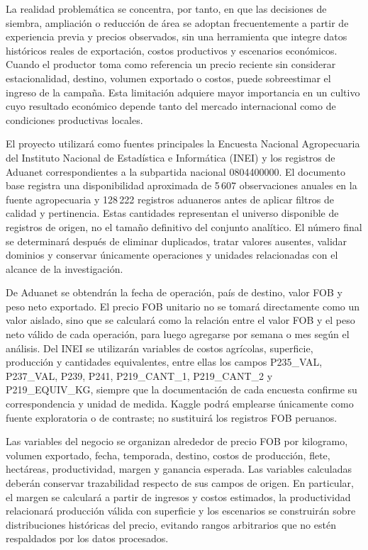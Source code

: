 La realidad problemática se concentra, por tanto, en que las decisiones de siembra, ampliación o reducción de área se adoptan frecuentemente a partir de experiencia previa y precios observados, sin una herramienta que integre datos históricos reales de exportación, costos productivos y escenarios económicos. Cuando el productor toma como referencia un precio reciente sin considerar estacionalidad, destino, volumen exportado o costos, puede sobreestimar el ingreso de la campaña. Esta limitación adquiere mayor importancia en un cultivo cuyo resultado económico depende tanto del mercado internacional como de condiciones productivas locales.

El proyecto utilizará como fuentes principales la Encuesta Nacional Agropecuaria del Instituto Nacional de Estadística e Informática (INEI) y los registros de Aduanet correspondientes a la subpartida nacional 0804400000. El documento base registra una disponibilidad aproximada de 5\,607 observaciones anuales en la fuente agropecuaria y 128\,222 registros aduaneros antes de aplicar filtros de calidad y pertinencia. Estas cantidades representan el universo disponible de registros de origen, no el tamaño definitivo del conjunto analítico. El número final se determinará después de eliminar duplicados, tratar valores ausentes, validar dominios y conservar únicamente operaciones y unidades relacionadas con el alcance de la investigación.

De Aduanet se obtendrán la fecha de operación, país de destino, valor FOB y peso neto exportado. El precio FOB unitario no se tomará directamente como un valor aislado, sino que se calculará como la relación entre el valor FOB y el peso neto válido de cada operación, para luego agregarse por semana o mes según el análisis. Del INEI se utilizarán variables de costos agrícolas, superficie, producción y cantidades equivalentes, entre ellas los campos P235\_VAL, P237\_VAL, P239, P241, P219\_CANT\_1, P219\_CANT\_2 y P219\_EQUIV\_KG, siempre que la documentación de cada encuesta confirme su correspondencia y unidad de medida. Kaggle podrá emplearse únicamente como fuente exploratoria o de contraste; no sustituirá los registros FOB peruanos.

Las variables del negocio se organizan alrededor de precio FOB por kilogramo, volumen exportado, fecha, temporada, destino, costos de producción, flete, hectáreas, productividad, margen y ganancia esperada. Las variables calculadas deberán conservar trazabilidad respecto de sus campos de origen. En particular, el margen se calculará a partir de ingresos y costos estimados, la productividad relacionará producción válida con superficie y los escenarios se construirán sobre distribuciones históricas del precio, evitando rangos arbitrarios que no estén respaldados por los datos procesados.

